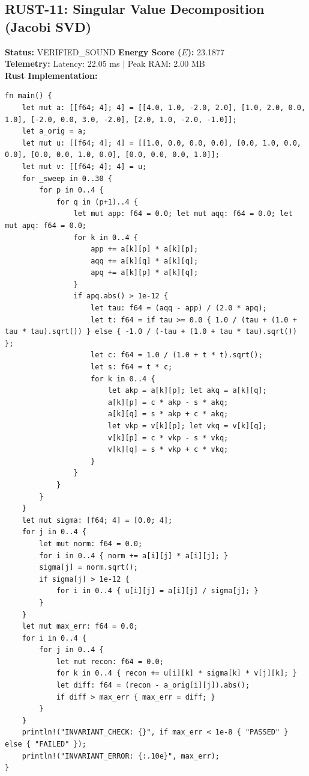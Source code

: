\documentclass[11pt, a4paper]{article}
\begin{document}
\subsection{RUST-11: Singular Value Decomposition (Jacobi SVD)}
\textbf{Status:} VERIFIED\_SOUND \hfill \textbf{Energy Score ($E$):} 23.1877\\
\textbf{Telemetry:} Latency: 22.05 ms $|$ Peak RAM: 2.00 MB\\
\textbf{Rust Implementation:}
\begin{verbatim}
fn main() {
    let mut a: [[f64; 4]; 4] = [[4.0, 1.0, -2.0, 2.0], [1.0, 2.0, 0.0, 1.0], [-2.0, 0.0, 3.0, -2.0], [2.0, 1.0, -2.0, -1.0]];
    let a_orig = a;
    let mut u: [[f64; 4]; 4] = [[1.0, 0.0, 0.0, 0.0], [0.0, 1.0, 0.0, 0.0], [0.0, 0.0, 1.0, 0.0], [0.0, 0.0, 0.0, 1.0]];
    let mut v: [[f64; 4]; 4] = u;
    for _sweep in 0..30 {
        for p in 0..4 {
            for q in (p+1)..4 {
                let mut app: f64 = 0.0; let mut aqq: f64 = 0.0; let mut apq: f64 = 0.0;
                for k in 0..4 {
                    app += a[k][p] * a[k][p];
                    aqq += a[k][q] * a[k][q];
                    apq += a[k][p] * a[k][q];
                }
                if apq.abs() > 1e-12 {
                    let tau: f64 = (aqq - app) / (2.0 * apq);
                    let t: f64 = if tau >= 0.0 { 1.0 / (tau + (1.0 + tau * tau).sqrt()) } else { -1.0 / (-tau + (1.0 + tau * tau).sqrt()) };
                    let c: f64 = 1.0 / (1.0 + t * t).sqrt();
                    let s: f64 = t * c;
                    for k in 0..4 {
                        let akp = a[k][p]; let akq = a[k][q];
                        a[k][p] = c * akp - s * akq;
                        a[k][q] = s * akp + c * akq;
                        let vkp = v[k][p]; let vkq = v[k][q];
                        v[k][p] = c * vkp - s * vkq;
                        v[k][q] = s * vkp + c * vkq;
                    }
                }
            }
        }
    }
    let mut sigma: [f64; 4] = [0.0; 4];
    for j in 0..4 {
        let mut norm: f64 = 0.0;
        for i in 0..4 { norm += a[i][j] * a[i][j]; }
        sigma[j] = norm.sqrt();
        if sigma[j] > 1e-12 {
            for i in 0..4 { u[i][j] = a[i][j] / sigma[j]; }
        }
    }
    let mut max_err: f64 = 0.0;
    for i in 0..4 {
        for j in 0..4 {
            let mut recon: f64 = 0.0;
            for k in 0..4 { recon += u[i][k] * sigma[k] * v[j][k]; }
            let diff: f64 = (recon - a_orig[i][j]).abs();
            if diff > max_err { max_err = diff; }
        }
    }
    println!("INVARIANT_CHECK: {}", if max_err < 1e-8 { "PASSED" } else { "FAILED" });
    println!("INVARIANT_ERROR: {:.10e}", max_err);
}
\end{verbatim}
\end{document}
